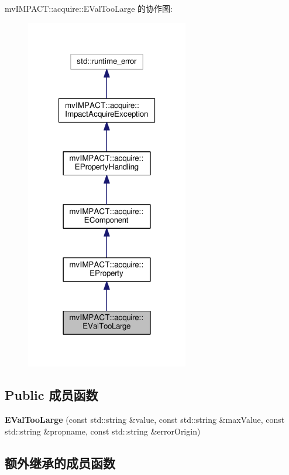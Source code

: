 mv\+I\+M\+P\+A\+C\+T\+:\+:acquire\+:\+:E\+Val\+Too\+Large 的协作图\+:
\nopagebreak
\begin{figure}[H]
\begin{center}
\leavevmode
\includegraphics[width=202pt]{classmv_i_m_p_a_c_t_1_1acquire_1_1_e_val_too_large__coll__graph}
\end{center}
\end{figure}
\subsection*{Public 成员函数}
\begin{DoxyCompactItemize}
\item 
\hypertarget{classmv_i_m_p_a_c_t_1_1acquire_1_1_e_val_too_large_a414087117dfd65cc5612bb384c4bc3b8}{{\bfseries E\+Val\+Too\+Large} (const std\+::string \&value, const std\+::string \&max\+Value, const std\+::string \&propname, const std\+::string \&error\+Origin)}\label{classmv_i_m_p_a_c_t_1_1acquire_1_1_e_val_too_large_a414087117dfd65cc5612bb384c4bc3b8}

\end{DoxyCompactItemize}
\subsection*{额外继承的成员函数}


